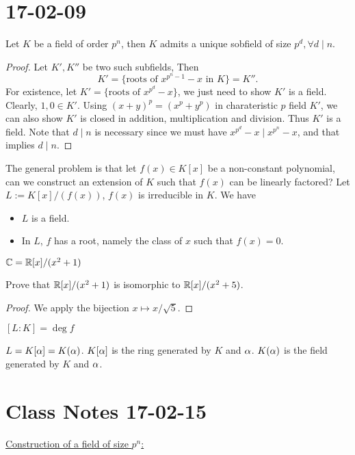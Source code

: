 \documentclass{mynotes}
\begin{document}
\section{17-02-09}
\begin{proposition}
	Let $K$ be a field of order $p^n$, then $K$ admits a unique sobfield of size $p^d,\forall d\mid n$.
\end{proposition}
\begin{proof}
	Let $K', K''$ be two such subfields, Then
	$$K'=\{\mbox{roots of $x^{p^n-1}-x$ in $K$}\} = K''.$$For existence, let $K' = \{\mbox{roots of $x^{p^d}-x$}\}$, we just need to show $K'$ is a field. Clearly, $1,0\in K'$. Using $(x+y)^{p} = (x^p+y^p)$ in charateristic $p$ field $K'$, we can also show $K'$ is closed in addition, multiplication and division. Thus $K'$ is a field. Note that $d\mid n$ is necessary since we must have $x^{p^d}-x\mid x^{p^n}-x$, and that implies $d\mid n$.
\end{proof}
The general problem is that let $f(x)\in K[x]$ be a non-constant polynomial, can we construct an extension of $K$ such that $f(x)$ can be linearly factored? Let $L:=K[x]/(f(x))$, $f(x)$ is irreducible in $K$. We have
\begin{theorem}\mbox{}
	\begin{itemize}
		\item $L$ is a field.
		\item In $L$, $f$ has a root, namely the class of $x$ such that $f(x)=0$.
	\end{itemize}
\end{theorem}
\begin{example}
	$\mathbb{C} = \mathbb{R}[x]/(x^2+1)$
\end{example}
\begin{exercise}
	Prove that $\mathbb{R}[x]/(x^2+1)$ is isomorphic to $\mathbb{R}[x]/(x^2+5)$.
\end{exercise}
\begin{proof}
	We apply the bijection $x\mapsto x/\sqrt{5}$.
\end{proof}
\begin{theorem}
	$[L:K] = \deg f$
\end{theorem}
\begin{corollary}
	$L=K[\alpha] = K(\alpha)$. $K[\alpha]$ is the ring generated by $K$ and $\alpha$. $K(\alpha)$ is the field generated by $K$ and $\alpha$.
\end{corollary}
\section{Class Notes 17-02-15}
\underline{Construction of a field of size $p^n$:}
\end{document}

